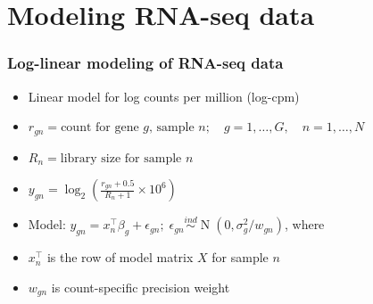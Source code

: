 \documentclass{beamer}
\newcommand{\op}{\operatorname}
\newcommand{\ind}{\stackrel{ind}{\sim}}
\begin{document}
\section[Model Intro]{Modeling RNA-seq data}

\begin{frame}
  \frametitle{Log-linear modeling of RNA-seq data}
  \begin{itemize}
    \item Linear model for log counts per million (log-cpm)
    \pause \item $r_{gn} = \mbox{count for gene }g \mbox{, sample }n;\quad g=1,\ldots,G,\quad n=1,\ldots,N$
    \pause \item $R_n = \mbox{library size for sample }n$
    \pause \item $y_{gn} = \log_2 \left(\frac{r_{gn}+0.5}{R_n+1}\times 10^6\right)$
    \pause \item Model: $y_{gn} = x_n^\top\beta_g + \epsilon_{gn};\; \epsilon_{gn} \ind \op{N}(0,\sigma^2_g/w_{gn})$, \pause where
    \item $x_n^\top$ is the row of model matrix $X$ for sample $n$
    \pause \item $w_{gn}$ is count-specific precision weight
  \end{itemize}
  
  {\scriptsize \citep{voom}}
\end{frame}
\end{document}

